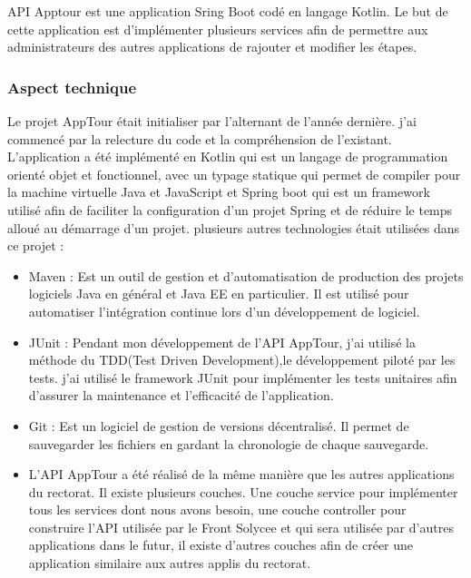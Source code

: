 \documentclass[12pt]{article}
\begin{document}
API Apptour est une application Sring Boot codé en langage Kotlin. Le but de cette application est d’implémenter plusieurs  services afin de permettre aux administrateurs des autres applications de rajouter et modifier les étapes. 


\subsubsection{Aspect technique}
 
 Le projet AppTour était initialiser par l'alternant de l'année dernière. j'ai commencé par la relecture du code et la compréhension de l'existant. L'application a été implémenté en Kotlin qui est un langage de programmation orienté objet et fonctionnel, avec un typage statique qui permet de compiler pour la machine virtuelle Java et JavaScript et Spring boot qui est un framework utilisé afin de faciliter la configuration d'un projet Spring et de réduire le temps alloué au démarrage d'un projet. plusieurs autres technologies était utilisées dans ce projet : 
 
\begin{itemize}
\item Maven :  Est un outil de gestion et d'automatisation de production des projets logiciels Java en général et Java EE en particulier. Il est utilisé pour automatiser l'intégration continue lors d'un développement de logiciel.

\item JUnit : Pendant mon développement de l'API AppTour, j'ai utilisé la méthode du TDD(Test Driven Development),le développement piloté par les tests. j'ai utilisé le framework JUnit pour implémenter les tests unitaires afin d'assurer la maintenance et l'efficacité de l’application.

\item Git : Est un logiciel de gestion de versions décentralisé. Il permet de sauvegarder les fichiers en gardant la chronologie de chaque sauvegarde.

\item L'API AppTour a été réalisé de la même manière que les autres applications du rectorat. Il existe plusieurs couches. Une couche service pour implémenter tous les services dont nous avons besoin, une couche controller pour construire l'API utilisée par le Front Solycee et qui sera utilisée par d'autres applications dans le futur, il existe d'autres couches afin de créer une application similaire aux autres applis du rectorat.

\end{itemize}
\end{document}
